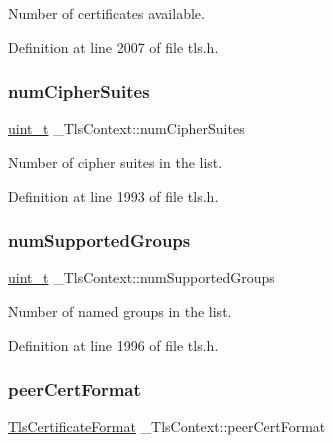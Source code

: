 Number of certificates available. 



Definition at line 2007 of file tls.\+h.

\mbox{\label{struct__TlsContext_a8a1f9843ffb44e59be29ec6946073522}} 
\subsubsection{\texorpdfstring{num\+Cipher\+Suites}{numCipherSuites}}
{\footnotesize\ttfamily \hyperlink{compiler__port_8h_a12a1e9b3ce141648783a82445d02b58d}{uint\+\_\+t} \+\_\+\+Tls\+Context\+::num\+Cipher\+Suites}



Number of cipher suites in the list. 



Definition at line 1993 of file tls.\+h.

\mbox{\label{struct__TlsContext_a9eacf4ea95aa4bf1964c3236abbba7d8}} 
\subsubsection{\texorpdfstring{num\+Supported\+Groups}{numSupportedGroups}}
{\footnotesize\ttfamily \hyperlink{compiler__port_8h_a12a1e9b3ce141648783a82445d02b58d}{uint\+\_\+t} \+\_\+\+Tls\+Context\+::num\+Supported\+Groups}



Number of named groups in the list. 



Definition at line 1996 of file tls.\+h.

\mbox{\label{struct__TlsContext_a2024bf1d4661aa0dfa40c686bbdcaa2f}} 
\subsubsection{\texorpdfstring{peer\+Cert\+Format}{peerCertFormat}}
{\footnotesize\ttfamily \hyperlink{tls_8h_a14c2a51c1d8cf969aa455b69e405c0d0}{Tls\+Certificate\+Format} \+\_\+\+Tls\+Context\+::peer\+Cert\+Format}



